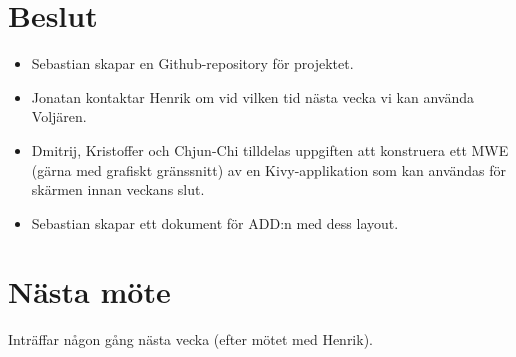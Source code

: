 \documentclass[a4paper,12pt]{article}
\begin{document}
\section{Beslut}
\begin{itemize}
\item Sebastian skapar en Github-repository för projektet.
\item Jonatan kontaktar Henrik om vid vilken tid nästa vecka vi kan använda Voljären.
\item Dmitrij, Kristoffer och Chjun-Chi tilldelas uppgiften att konstruera ett MWE (gärna med
    grafiskt gränssnitt) av en Kivy-applikation som kan användas för skärmen innan veckans slut.
\item Sebastian skapar ett dokument för ADD:n med dess layout.
\end{itemize}

\section{Nästa möte}
Inträffar någon gång nästa vecka (efter mötet med Henrik).
\end{document}
